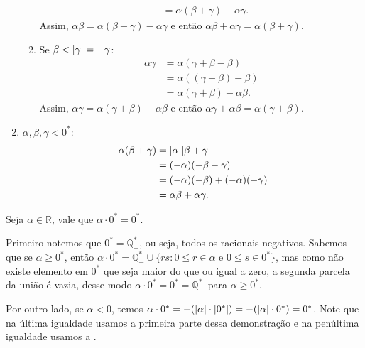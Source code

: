 \documentclass[../main.tex]{subfiles}
\begin{document}
\begin{dem}
\begin{enumerate}
\begin{enumerate}
\begin{align*}
                        &= \alpha(\beta+\gamma) - \alpha\gamma.
                    \end{align*}
                    Assim, $\alpha\beta = \alpha(\beta+\gamma) - \alpha\gamma$ e então $\alpha\beta + \alpha\gamma = \alpha(\beta+\gamma)$.
                \item Se $\beta < \abs{\gamma} = -\gamma$:
                    \begin{align*}
                        \alpha\gamma &= \alpha(\gamma+\beta-\beta) \\
                        &= \alpha((\gamma+\beta)-\beta) \\
                        &= \alpha(\gamma+\beta) - \alpha\beta.
                    \end{align*}
                    Assim, $\alpha\gamma = \alpha(\gamma+\beta) - \alpha\beta$ e então $\alpha\gamma + \alpha\beta = \alpha(\gamma+\beta)$.
            \end{enumerate}
        \item $\alpha,\beta,\gamma < 0^*$:
        \begin{align*}
            \alpha(\beta+\gamma) &= \abs{\alpha}\abs{\beta+\gamma} \\
            &= (-\alpha)(-\beta-\gamma) \\
            &= (-\alpha)(-\beta) + (-\alpha)(-\gamma) \\
            &= \alpha\beta + \alpha\gamma.
        \end{align*}
    \end{enumerate}
\end{dem}

\begin{teo}\label{reais-teo-anulamentoProduto}
    Seja $\alpha \in \mathbb{R}$, vale que $\alpha \cdot 0^* = 0^*$.
\end{teo}
\begin{dem}
    Primeiro notemos que $0^* = \mathbb{Q}_{-}^*$, ou seja, todos os racionais negativos. Sabemos que se $\alpha \geq 0^*$, 
    então $\alpha \cdot 0^* = \mathbb{Q}_{-}^* \cup \{ rs : 0 \leq r \in \alpha$ e $0 \leq s \in 0^* \}$, mas como não existe elemento em $0^*$ que seja maior do que ou igual a zero, a segunda parcela da união é vazia, desse modo $\alpha \cdot 0^* = 0^* = \mathbb{Q}_{-}^*$ para $\alpha \geq 0^*$.

    Por outro lado, se $\alpha < 0$, temos $\alpha \cdot 0^* = -(\abs{\alpha} \cdot \abs{0^*}) = -(\abs{\alpha} \cdot 0^*) = 0^*$. Note que na última igualdade usamos a primeira parte dessa demonstração e na penúltima igualdade usamos a .
\end{dem}
\end{document}
